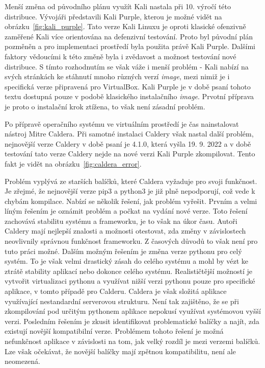 
Menší změna od původního plánu využít Kali nastala při 10. výročí této distribuce\cite{kali_purple}.
Vývojáři představili Kali Purple, kterou je možné vidět na obrázku~\ref{fig:kali_purple}.
Tato verze Kali Linuxu je oproti klasické ofenzivně zaměřené Kali více orientována na defenzivní testování.
Proto byl původní plán pozměněn a pro implementaci prostředí byla použita právě Kali Purple.
Dalšími faktory vědoucími k této změně byla i zvědavost a možnost testování nové distribuce.
S tímto rozhodnutím se však váže i menší problém - Kali nabízí na svých stránkách ke stáhnutí mnoho různých verzí \textit{image}, mezi nimiž je i specifická verze připravená pro VirtualBox.
Kali Purple je v době psaní tohoto textu dostupná pouze v podobě klasického instalačního \textit{image}.
Prvotní příprava je proto o instalační krok ztížena, to však není zásadní problém.

Po přípravě operačního systému ve virtuálním prostředí je čas nainstalovat nástroj Mitre Caldera.
Při samotné instalaci Caldery však nastal další problém, nejnovější verze Caldery v době psaní je 4.1.0, která vyšla 19. 9. 2022 a v době testování tato verze Caldery nejde na nové verzi Kali Purple zkompilovat.
Tento fakt je vidět na obrázku~\ref{fig:caldera_error}.


\noindent %
Problém vyplývá ze starších balíčků, které Caldera vyžaduje pro svoji funkčnost.
Je zřejmé, že nejnovější verze pip3 a python3 je již plně nepodporují, což vede k chybám kompilace.
Nabízí se několik řešení, jak problém vyřešit.
Prvním a velmi líným řešením je oznámit problém a počkat na vydání nové verze.
Toto řešení zachovává stabilitu systému a frameworku, je to však na úkor času.
Autoři Caldery mají nejlepší znalosti a možnosti otestovat, zda změny v závislostech neovlivnily správnou funkčnost frameworku.
Z časových důvodů to však není pro tuto práci možné.
Dalším možným řešením je změna verze pythonu pro celý systém.
To je však velmi drastický zásah do celého systému a mohl by vézt ke ztrátě stability aplikací nebo dokonce celého systému.
Realističtější možností je vytvořit virtualizaci pythonu a využívat nižší verzi pythonu pouze pro specifické aplikace, v tomto případě pro Calderu.
Caldera je však složitá aplikace využívající nestandardní serverovou strukturu.
Není tak zajištěno, že se při zkompilování pod určitým pythonem aplikace nepokusí využívat systémovou vyšší verzi.
Posledním řešením je zkusit identifikovat problematické balíčky a najít, zda existují novější kompatibilní verze.
Problémem tohoto řešení je možná nefunkčnost aplikace v závislosti na tom, jak velký rozdíl je mezi verzemi balíčků.
Lze však očekávat, že novější balíčky mají zpětnou kompatibilitu, není ale neomezená.

